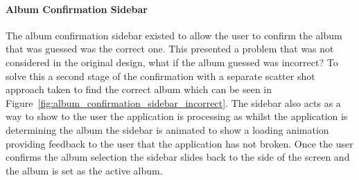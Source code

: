 \paragraph{Album Confirmation Sidebar}
The album confirmation sidebar existed to allow the user to confirm the album that was guessed was the correct one. This presented a problem that was not considered in the original design, what if the album guessed was incorrect? To solve this a second stage of the confirmation with a separate scatter shot approach taken to find the correct album which can be seen in Figure~\ref{fig:album_confirmation_sidebar_incorrect}. The sidebar also acts as a way to show to the user the application is processing as whilst the application is determining the album the sidebar is animated to show a loading animation providing feedback to the user that the application has not broken. Once the user confirms the album selection the sidebar slides back to the side of the screen and the album is set as the active album.

